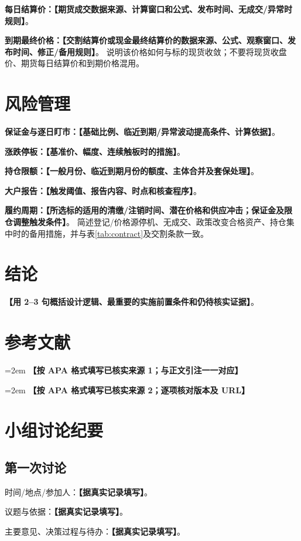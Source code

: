 \documentclass[UTF8,a4paper,11pt,oneside,fontset=fandol]{ctexart}
\newcommand{\fillin}[1]{\textcolor{promptgray}{\textbf{【#1】}}}
\newcommand{\APAEntry}[1]{\par\noindent\hangindent=2em\hangafter=1 #1\par}
\newif\ifIncludeAppendices
\begin{document}
\noindent\textbf{每日结算价：}\fillin{期货成交数据来源、计算窗口和公式、发布时间、无成交/异常时规则}。

\noindent\textbf{到期最终价格：}\fillin{交割结算价或现金最终结算价的数据来源、公式、观察窗口、发布时间、修正/备用规则}。
说明该价格如何与标的现货收敛；不要将现货收盘价、期货每日结算价和到期价格混用。

\section{风险管理}
\noindent\textbf{保证金与逐日盯市：}\fillin{基础比例、临近到期/异常波动提高条件、计算依据}。

\noindent\textbf{涨跌停板：}\fillin{基准价、幅度、连续触板时的措施}。

\noindent\textbf{持仓限额：}\fillin{一般月份、临近到期月份的额度、主体合并及套保处理}。

\noindent\textbf{大户报告：}\fillin{触发阈值、报告内容、时点和核查程序}。

\noindent\textbf{履约周期：}\fillin{所选标的适用的清缴/注销时间、潜在价格和供应冲击；保证金及限仓调整触发条件}。
简述登记/价格源停机、无成交、政策改变合格资产、持仓集中时的备用措施，并与表\ref{tab:contract}及交割条款一致。

\section{结论}
\fillin{用 2--3 句概括设计逻辑、最重要的实施前置条件和仍待核实证据}。

\section*{参考文献}
\APAEntry{\fillin{按 APA 格式填写已核实来源 1；与正文引注一一对应}}
\APAEntry{\fillin{按 APA 格式填写已核实来源 2；逐项核对版本及 URL}}

\ifIncludeAppendices
\clearpage
\appendix
\section{小组讨论纪要}
\subsection*{第一次讨论}
\noindent 时间/地点/参加人：\fillin{据真实记录填写}。\par
\noindent 议题与依据：\fillin{据真实记录填写}。\par
\noindent 主要意见、决策过程与待办：\fillin{据真实记录填写}。\par
\end{document}
